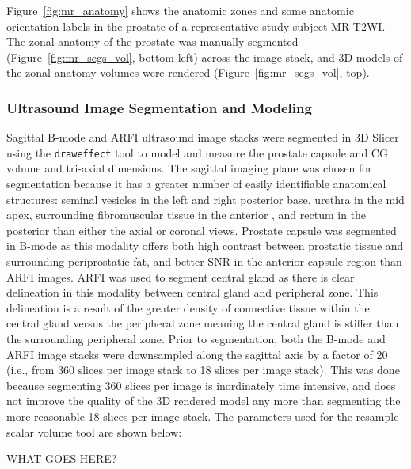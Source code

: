 Figure~\ref{fig:mr_anatomy} shows the anatomic zones and some anatomic
orientation labels in the prostate of a representative study subject MR T2WI.
The zonal anatomy of the prostate was manually segmented
(Figure~\ref{fig:mr_segs_vol}, bottom left) across the image stack, and 3D
models of the zonal anatomy volumes were rendered
(Figure~\ref{fig:mr_segs_vol}, top).





\subsubsection{Ultrasound Image Segmentation and Modeling}
Sagittal B-mode and ARFI ultrasound image stacks were segmented in 3D Slicer
using the \verb+draweffect+ tool to model and measure the prostate capsule and CG
volume and tri-axial dimensions.  The sagittal imaging plane was chosen for
segmentation because it has a greater number of easily identifiable anatomical
structures:  seminal vesicles in the left and right posterior base, urethra in
the mid apex, surrounding fibromuscular tissue in the anterior , and rectum in
the posterior  than either the axial or coronal views. Prostate capsule was
segmented in B-mode as this modality offers both high contrast between
prostatic tissue and surrounding periprostatic fat, and better SNR in the
anterior capsule region than ARFI images. ARFI was used to segment central gland as
there is clear delineation in this modality between central gland and
peripheral zone. This delineation is a result of the greater density of
connective tissue within the central gland versus the peripheral zone meaning
the central gland is stiffer than the surrounding peripheral zone.  Prior to
segmentation, both the B-mode and ARFI image stacks were downsampled along the
sagittal axis by a factor of 20 (i.e., from 360 slices per image stack to 18
slices per image stack). This was done because segmenting 360 slices per image
is inordinately time intensive, and does not improve the quality of the 3D
rendered model any more than segmenting the more reasonable 18 slices per image
stack. The parameters used for the resample scalar volume tool are shown below:

WHAT GOES HERE?

